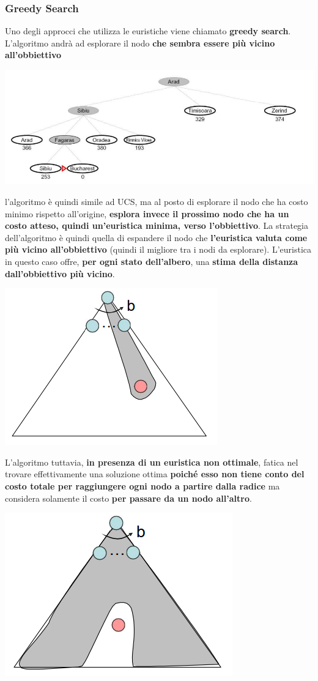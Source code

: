 \documentclass[12pt]{article}
\begin{document}
\subsubsection{Greedy Search}
Uno degli approcci che utilizza le euristiche viene chiamato \textbf{greedy search}.
L'algoritmo andrà ad esplorare il nodo \textbf{che sembra essere più vicino all'obbiettivo}
\begin{center}
    \includegraphics[width = 1\linewidth]{Images/44.PNG}
\end{center}
l'algoritmo è quindi simile ad UCS, ma al posto di esplorare il nodo che ha costo minimo rispetto all'origine,
\textbf{esplora invece il prossimo nodo che ha un costo atteso, quindi un'euristica minima, verso l'obbiettivo}.
La strategia dell'algoritmo è quindi quella di espandere il nodo che \textbf{l'euristica valuta come più vicino all'obbiettivo} (quindi il migliore tra i nodi da esplorare).
L'euristica in questo caso offre, \textbf{per ogni stato dell'albero}, una \textbf{stima della distanza dall'obbiettivo più vicino}.
\begin{center}
    \includegraphics[width = 0.40\linewidth]{Images/45.PNG}
\end{center}
L'algoritmo tuttavia, \textbf{in presenza di un euristica non ottimale}, fatica nel trovare effettivamente una soluzione ottima \textbf{poiché esso non tiene conto del costo totale per raggiungere ogni nodo a partire dalla radice} ma
considera solamente il costo \textbf{per passare da un nodo all'altro}.
\begin{center}
    \includegraphics[width = 0.40\linewidth]{Images/46.PNG}
\end{center}
\end{document}
